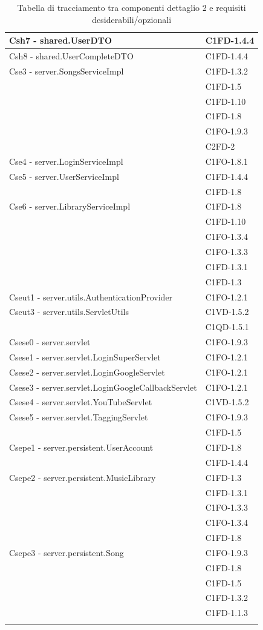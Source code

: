 \begin{footnotesize}
\begin{longtable}[!h]{|l|l|}
Csh7 - shared.UserDTO & C1FD-1.4.4 \\\hline
Csh8 - shared.UserCompleteDTO & C1FD-1.4.4 \\\hline
Cse3 - server.SongsServiceImpl & C1FD-1.3.2 \\
& C1FD-1.5 \\
& C1FD-1.10 \\
& C1FD-1.8 \\
& C1FO-1.9.3 \\
& C2FD-2 \\\hline
Cse4 - server.LoginServiceImpl & C1FO-1.8.1 \\\hline
Cse5 - server.UserServiceImpl & C1FD-1.4.4 \\
& C1FD-1.8 \\\hline
Cse6 - server.LibraryServiceImpl & C1FD-1.8 \\
& C1FD-1.10 \\
& C1FO-1.3.4 \\
& C1FO-1.3.3 \\
& C1FD-1.3.1 \\
& C1FD-1.3 \\\hline
Cseut1 - server.utils.AuthenticationProvider & C1FO-1.2.1 \\\hline
Cseut3 - server.utils.ServletUtils & C1VD-1.5.2 \\
& C1QD-1.5.1 \\\hline
Csese0 - server.servlet & C1FO-1.9.3 \\\hline
Csese1 - server.servlet.LoginSuperServlet &  C1FO-1.2.1 \\\hline
Csese2 - server.servlet.LoginGoogleServlet & C1FO-1.2.1 \\\hline
Csese3 - server.servlet.LoginGoogleCallbackServlet & C1FO-1.2.1 \\\hline
Csese4 - server.servlet.YouTubeServlet & C1VD-1.5.2 \\\hline
Csese5 - server.servlet.TaggingServlet & C1FO-1.9.3 \\
& C1FD-1.5 \\\hline
Csepe1 - server.persistent.UserAccount & C1FD-1.8 \\
& C1FD-1.4.4 \\\hline
Csepe2 - server.persistent.MusicLibrary & C1FD-1.3 \\
& C1FD-1.3.1 \\
& C1FO-1.3.3 \\
& C1FO-1.3.4 \\
& C1FD-1.8 \\\hline
Csepe3 - server.persistent.Song & C1FO-1.9.3 \\
& C1FD-1.8 \\
& C1FD-1.5 \\
& C1FD-1.3.2 \\
& C1FD-1.1.3 \\\hline
\caption{Tabella di tracciamento tra componenti dettaglio 2 e requisiti
desiderabili/opzionali}
\end{longtable}
\end{footnotesize}

